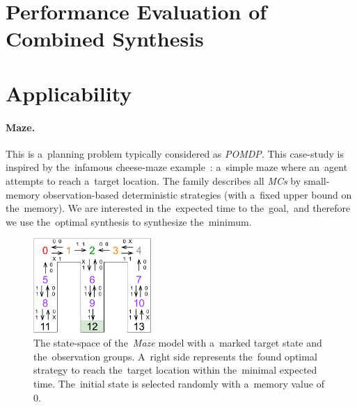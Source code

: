 \section{Performance Evaluation of Combined Synthesis}

\section{Applicability}

\paragraph{Maze.} This is a~planning problem typically considered as \textit{POMDP}.
This case-study is inspired by the~infamous cheese-maze example~\cite{maze}: a~simple maze where an~agent attempts to reach a~target location.
The family describes all \textit{MCs} by small-memory observation-based deterministic strategies (with a~fixed upper bound on the~memory).
We are interested in the~expected time to the~goal,~and therefore we use the~optimal synthesis to synthesize the~minimum.

\begin{figure}[ht!]
\centering
\includegraphics[width=0.4\textwidth]{figures/maze.pdf}
\caption{The state-space of the~\textit{Maze} model with a~marked target state and the~observation groups. A~right side represents the~found optimal strategy to reach the~target location within the~minimal expected time. The~initial state is selected randomly with a~memory value of 0.}%
\label{fig:maze}%
\end{figure}

